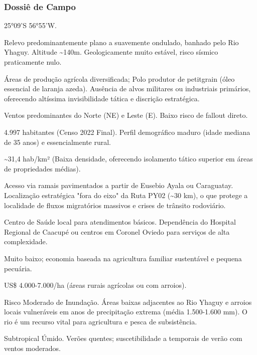 \subsubsection{Dossiê de Campo}
\begin{description}[style=nextline,leftmargin=0.5cm,font=\bfseries]
\item[Coordenadas]  25°09'S 56°55'W.
\item[Topografia]  Relevo predominantemente plano a suavemente ondulado, banhado pelo Rio Yhaguy. Altitude \textasciitilde 140m. Geologicamente muito estável, risco sísmico praticamente nulo.
\item[Alvos Estratégicos]  Áreas de produção agrícola diversificada; Polo produtor de petitgrain (óleo essencial de laranja azeda). Ausência de alvos militares ou industriais primários, oferecendo altíssima invisibilidade tática e discrição estratégica.
\item[Fallout]  Ventos predominantes do Norte (NE) e Leste (E). Baixo risco de fallout direto.
\item[População]  4.997 habitantes (Censo 2022 Final). Perfil demográfico maduro (idade mediana de 35 anos) e essencialmente rural.
\item[Densidade]  \textasciitilde 31,4 hab/\allowbreak km² (Baixa densidade, oferecendo isolamento tático superior em áreas de propriedades médias).
\item[Vias de Acesso]  Acesso via ramais pavimentados a partir de Eusebio Ayala ou Caraguatay. Localização estratégica "fora do eixo" da Ruta PY02 (\textasciitilde 30 km), o que protege a localidade de fluxos migratórios massivos e crises de trânsito rodoviário.
\item[Serviços]  Centro de Saúde local para atendimentos básicos. Dependência do Hospital Regional de Caacupé ou centros em Coronel Oviedo para serviços de alta complexidade.
\item[Custo de Vida]  Muito baixo; economia baseada na agricultura familiar sustentável e pequena pecuária.
\item[Preço da Terra]  US\$ 4.000-7.000/\allowbreak ha (áreas rurais agrícolas ou com arroios).
\item[Hidrologia]  Risco Moderado de Inundação. Áreas baixas adjacentes ao Rio Yhaguy e arroios locais vulneráveis em anos de precipitação extrema (média 1.500-1.600 mm). O rio é um recurso vital para agricultura e pesca de subsistência.
\item[Clima]  Subtropical Úmido. Verões quentes; suscetibilidade a temporais de verão com ventos moderados.

\end{description}
